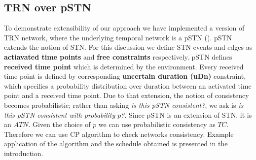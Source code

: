 \subsection{TRN over pSTN}
To demonstrate extensibility of our approach we have implemented a version of TRN network, where the underlying temporal network is a pSTN (\cite{Fang2014}). pSTN extends the notion of STN. For this discussion we define STN events and edges as \textbf{actiavated time points} and \textbf{free constraints} respectively. pSTN defines \textbf{received time point} which is determined by the environment. Every received time point is defined by corresponding \textbf{uncertain duration (uDn)} constraint, which specifies a probability distribution over duration between an activated time point and a received time point. Due to that extension, the notion of consistency becomes probabilistic; rather than asking \textit{is this pSTN consistent?}, we ask is \textit{is this pSTN consistent with probability $p$?}. Since pSTN is an extension of STN, it is an $ATN$. Given the choice of $p$ we can use probabilistic consistency as $TC$. Therefore we can use CP algorithm to check networks consistency. Example application of the algorithm and the schedule obtained is presented in the introduction.
